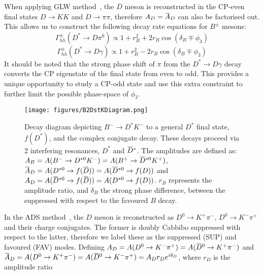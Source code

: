 \documentclass[oneside,12pt]{article}
\newcommand{\overbar}[1]{\mkern 1.5mu\overline{\mkern-1.5mu#1\mkern-1.5mu}\mkern 1.5mu}
\begin{document}
When applying GLW method~\cite{GLWRef}, the $D$ meson is reconstructed in the
CP-even final states $D\rightarrow KK$ and $D\rightarrow \pi \pi$, therefore
$A_{D}=\overbar{A}_{D}$ can also be factorised out. This allows us to construct
the following decay rate equations for $B^{\pm}$ mesons:
  \begin{equation}
		\Gamma_{hh}^{\pm}(D^{*}\rightarrow D\pi^{0})\propto 1 + r_{B}^{2} + 2r_{B}\cos(\delta_{B}\mp \phi_{3})
    \label{eq:DecayRateGLWpi0}
  \end{equation}
  \begin{equation}
		\Gamma_{hh}^{\pm}(D^{*}\rightarrow D\gamma)\propto 1 + r_{B}^{2} - 2r_{B}\cos(\delta_{B}\mp \phi_{3})
    \label{eq:DecayRateGLWgamma}
  \end{equation}
\noindent It should be noted that the strong phase shift of $\pi$ from the
$D^{*}\rightarrow D\gamma$ decay converts the CP eigenstate of the final state
from even to odd. This provides a unique opportunity to study a CP-odd state and
use this extra constraint to further limit the possible phase-space of $\phi_3$. 
\begin{figure}[H]
  \centering \texttt{[image: figures/B2DstKDiagram.png]}
  \caption{\small{Decay diagram depicting ${B}^{-}\rightarrow{D}^{*}{K}^{-}$ to
  a general $D^{*}$ final state, $f(D^{*})$, and the complex conjugate decay.
  These decays proceed via 2 interfering resonances, $D^{*}$ and
  $\overbar{D}^{*}$. The amplitudes are defined as: $A_{B}=A(B^{-}\rightarrow
  D^{*0}K^{-})=A(B^{+}\rightarrow \overbar{D}^{*0}K^{+})$,
  $\overbar{A}_{D}=A(D^{*0}\rightarrow
  f(\overbar{D}))=A(\overbar{D}^{*0}\rightarrow f(D))$ and
  $A_{D}=A(\overbar{D}^{*0}\rightarrow f(\overbar{D}))=A(D^{*0}\rightarrow
  f(D))$. $r_{B}$ represents the amplitude ratio, and $\delta_{B}$ the strong
  phase difference, between the suppressed with respect to the favoured $B$
  decay.}} \label{fig:B2DstKDiagram} \vspace{-10pt}
\end{figure}
\noindent In the ADS method~\cite{ADSRef}, the $D$ meson is reconstructed as
$D^{0}\rightarrow K^{+}\pi^{-}$, $D^{0}\rightarrow K^{-}\pi^{+}$ and their
charge conjugates. The former is doubly Cabbibo suppressed with respect to the
latter, therefore we label these as the suppressed (SUP) and favoured (FAV)
modes. Defining $A_{D}=A(D^{0}\rightarrow
K^{-}\pi^{+})=A(\overbar{D}^{0}\rightarrow K^{+}\pi^{-})$ and $\overbar{A}_{D}=
A(D^{0}\rightarrow K^{+}\pi^{-})=A(\overbar{D}^{0}\rightarrow
K^{-}\pi^{+})=A_{D}r_{D}e^{i\delta_{D}}$, where $r_{D}$ is the amplitude ratio
\end{document}
